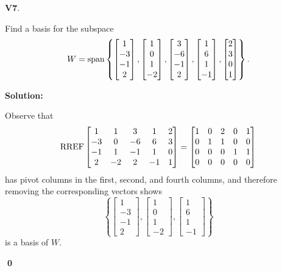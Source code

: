 \documentclass{article}
\newenvironment{problem}[1]
{
  \begin{flushleft}
  \textbf{#1}.
  \ignorespaces
}
{
  \end{flushleft}
}
\newenvironment{solution}
{
  \ignorespaces
  \textbf{Solution:}
}
{
  \ignorespacesafterend
  \begin{flushright}
  {\bfseries \qed}
  \end{flushright}
}
\begin{document}
\begin{problem}{V7}
Find a basis for the subspace 
\[
  W = \operatorname{span} \left\{
  \begin{bmatrix} 1 \\ -3 \\ -1 \\ 2 \end{bmatrix} ,
  \begin{bmatrix} 1 \\ 0 \\ 1 \\ -2 \end{bmatrix} ,
  \begin{bmatrix} 3 \\ -6 \\ -1 \\ 2 \end{bmatrix} ,
  \begin{bmatrix} 1 \\ 6 \\ 1 \\ -1 \end{bmatrix} ,
  \begin{bmatrix} 2 \\ 3 \\ 0 \\ 1 \end{bmatrix}
  \right\} .
\]
\end{problem}
\begin{solution}
Observe that
\[ \operatorname{RREF}
    \begin{bmatrix}
    1 & 1 & 3 & 1 & 2 \\
    -3 & 0 & -6 & 6 & 3 \\
    -1 & 1 & -1 & 1 & 0 \\
    2 & -2 & 2 & -1 & 1
    \end{bmatrix} =
    \begin{bmatrix}
    1 & 0 & 2 & 0 & 1 \\
    0 & 1 & 1 & 0 & 0 \\
    0 & 0 & 0 & 1 & 1 \\
    0 & 0 & 0 & 0 & 0
    \end{bmatrix}
\]
has pivot columns in the first, second, and fourth columns, and therefore removing the corresponding vectors shows
\[\left\{
  \begin{bmatrix} 1 \\ -3 \\ -1 \\ 2 \end{bmatrix} ,
  \begin{bmatrix} 1 \\ 0 \\ 1 \\ -2 \end{bmatrix} ,
  \begin{bmatrix} 1 \\ 6 \\ 1 \\ -1 \end{bmatrix}
  \right\}
\]
is a basis of \(W\).
\end{solution}
\end{document}
